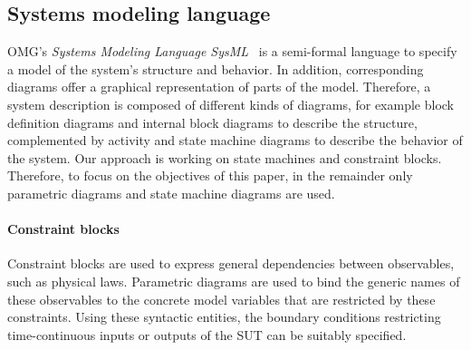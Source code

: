 \subsection{Systems modeling language}

OMG's \emph{Systems Modeling Language SysML}~\cite{SysML15} is a semi-formal language to specify a model of the system's structure and behavior. In addition, corresponding diagrams offer a graphical representation of parts of the model. Therefore, a system description is composed of different kinds of diagrams, for example block definition diagrams and internal block diagrams to describe the structure, complemented by activity and state machine diagrams to describe the behavior of the system. Our approach is working on state machines and constraint blocks. Therefore, to focus on the objectives of this paper, in the remainder only parametric diagrams and state machine diagrams are used. 



\paragraph{Constraint blocks}
Constraint blocks are used to
express general dependencies between observables, such as physical laws. 
Parametric diagrams are used to bind the generic names of these observables to the
concrete model variables that are restricted by these constraints. Using these syntactic
entities, the boundary conditions restricting time-continuous inputs or outputs of  
the SUT can be suitably specified. 

